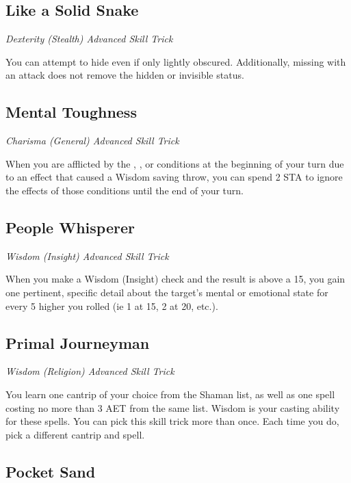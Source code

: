 \subsection{Like a Solid Snake}

\textit{Dexterity (Stealth) Advanced Skill Trick}

You can attempt to hide even if only lightly obscured. Additionally, missing with an attack does not remove the hidden or invisible status.

\subsection{Mental Toughness}

\textit{Charisma (General) Advanced Skill Trick}

When you are afflicted by the , , or  conditions at the beginning of your turn due to an effect that caused a Wisdom saving throw, you can spend 2 STA to ignore the effects of those conditions until the end of your turn.

\subsection{People Whisperer}

\textit{Wisdom (Insight) Advanced Skill Trick}

When you make a Wisdom (Insight) check and the result is above a 15, you gain one pertinent, specific detail about the target's mental or emotional state for every 5 higher you rolled (ie 1 at 15, 2 at 20, etc.).

\subsection{Primal Journeyman}

\textit{Wisdom (Religion) Advanced Skill Trick}

You learn one cantrip of your choice from the Shaman list, as well as one spell costing no more than 3 AET from the same list. Wisdom is your casting ability for these spells. You can pick this skill trick more than once. Each time you do, pick a different cantrip and spell.

\subsection{Pocket Sand}

